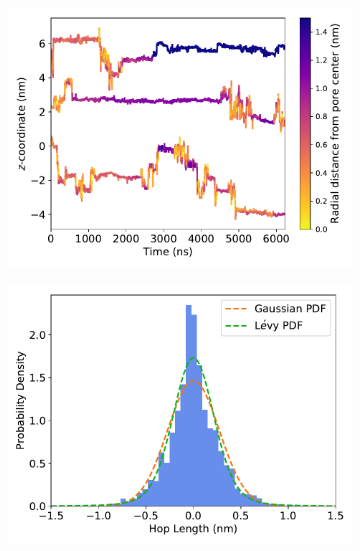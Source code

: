 \documentclass{article}
\begin{document}
  \begin{figure}
  \centering
  \begin{subfigure}{0.45\textwidth}
  \includegraphics[width=\textwidth]{ACH_trajectories.pdf}
  \caption{}\label{fig:ACH_solute_trajectories}
  \end{subfigure}
  \begin{subfigure}{0.45\textwidth}
  \includegraphics[width=\textwidth]{gaussian_levy_comparison_anomalous_ACH.pdf}
  \caption{}\label{fig:ACH_hop_distribution_comparison}
  \end{subfigure}

\end{figure}
\end{document}
